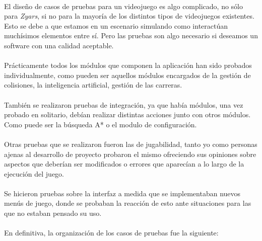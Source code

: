 
\paragraph{}
El diseño de casos de pruebas para un videojuego es algo complicado, no sólo para \emph{Zyars}, si no para la mayoría de los
distintos tipos de videojuegos existentes. Esto se debe a que estamos en un
escenario simulando como interactúan muchísimos 
elementos entre sí. Pero las pruebas son algo necesario si deseamos un software con una calidad aceptable.

\paragraph{}
Prácticamente todos los módulos que componen la aplicación han sido probados individualmente, como pueden ser aquellos módulos 
encargados de la gestión de colisiones, la inteligencia artificial, gestión de las carreras.

\paragraph{}
También se realizaron pruebas de integración, ya que había módulos, una vez probado en solitario, debían realizar distintas acciones 
junto con otros módulos. Como puede ser la búsqueda A* o el modulo de configuración.

\paragraph{}
Otras pruebas que se realizaron fueron las de jugabilidad, tanto yo como
personas ajenas al desarrollo de proyecto probaron el 
mismo ofreciendo sus opiniones sobre aspectos que deberían ser modificados o
errores que aparecían a lo largo de la ejecución
del juego.

\paragraph{}
Se hicieron pruebas sobre la interfaz a medida que se implementaban nuevos menús de juego, donde se probaban
la reacción de esto ante situaciones para las que no estaban pensado su uso.

\paragraph{}
En definitiva, la organización de los casos de pruebas fue la siguiente:

